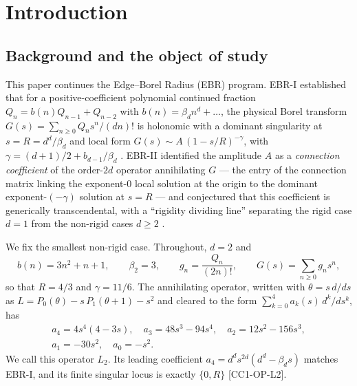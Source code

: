 \documentclass[11pt,reqno]{amsart}
\theoremstyle{plain}
\theoremstyle{definition}
\theoremstyle{remark}
\newcommand{\Ltwo}{L_{2}}
\newcommand{\claim}[1]{\textsf{\small[#1]}}
\begin{document}
\maketitle

\section{Introduction}\label{sec:intro}

\subsection{Background and the object of study}
This paper continues the Edge--Borel Radius (EBR) program. EBR-I established
that for a positive-coefficient polynomial continued fraction
$Q_{n}=b(n)Q_{n-1}+Q_{n-2}$ with $b(n)=\beta_{d}n^{d}+\dots$, the physical
Borel transform $G(s)=\sum_{n\ge0}Q_{n}s^{n}/(dn)!$ is holonomic with a
dominant singularity at $s=R=d^{d}/\beta_{d}$ and local form
$G(s)\sim A\,(1-s/R)^{-\gamma}$, with $\gamma=(d+1)/2+b_{d-1}/\beta_{d}$
\cite{EBRI}. EBR-II identified the amplitude $A$ as a \emph{connection
coefficient} of the order-$2d$ operator annihilating $G$ --- the entry of the
connection matrix linking the exponent-$0$ local solution at the origin to the
dominant exponent-$(-\gamma)$ solution at $s=R$ --- and conjectured that this
coefficient is generically transcendental, with a ``rigidity dividing line''
separating the rigid case $d=1$ from the non-rigid cases $d\ge2$
\cite{EBRII}.

We fix the smallest non-rigid case. Throughout, $d=2$ and
\begin{equation}\label{eq:family}
  b(n)=3n^{2}+n+1,\qquad \beta_{2}=3,\qquad
  g_{n}=\frac{Q_{n}}{(2n)!},\qquad G(s)=\sum_{n\ge0}g_{n}s^{n},
\end{equation}
so that $R=4/3$ and $\gamma=11/6$. The annihilating operator, written with
$\theta=s\,d/ds$ as $L=P_{0}(\theta)-s\,P_{1}(\theta+1)-s^{2}$ and cleared to
the form $\sum_{k=0}^{4}a_{k}(s)\,d^{k}/ds^{k}$, has
\begin{equation}\label{eq:operator}
\begin{gathered}
  a_{4}=4s^{4}(4-3s),\quad a_{3}=48s^{3}-94s^{4},\quad a_{2}=12s^{2}-156s^{3},\\
  a_{1}=-30s^{2},\quad a_{0}=-s^{2}.
\end{gathered}
\end{equation}
We call this operator $\Ltwo$. Its leading coefficient
$a_{4}=d^{d}s^{2d}(d^{d}-\beta_{d}s)$ matches EBR-I, and its finite singular
locus is exactly $\{0,R\}$ \claim{CC1-OP-L2}.
\end{document}
